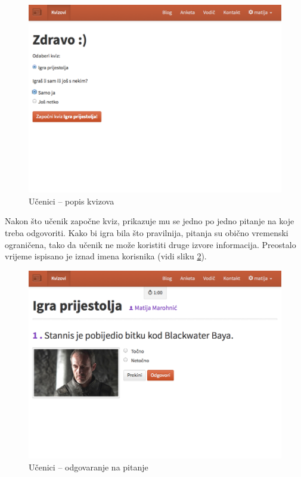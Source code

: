 \documentclass[11pt]{scrreprt}
\begin{document}
\begin{figure}[H]
  \includegraphics[width=\textwidth, clip=true, trim=0 8.5cm 0 0, fbox]{student/quizzes}
  \caption{Učenici -- popis kvizova}
  \label{student/quizzes}
\end{figure}

Nakon što učenik započne kviz, prikazuje mu se jedno po jedno pitanje na koje
treba odgovoriti. Kako bi igra bila što pravilnija, pitanja su obično vremenski
ograničena, tako da učenik ne može koristiti druge izvore informacija.
Preostalo vrijeme ispisano je iznad imena korisnika (vidi sliku
\ref{question}).

\begin{figure}[H]
  \includegraphics[width=\textwidth, clip=true, trim=0 7cm 0 0, fbox]{student/boolean_question}
  \caption{Učenici -- odgovaranje na pitanje}
  \label{question}
\end{figure}
\end{document}
